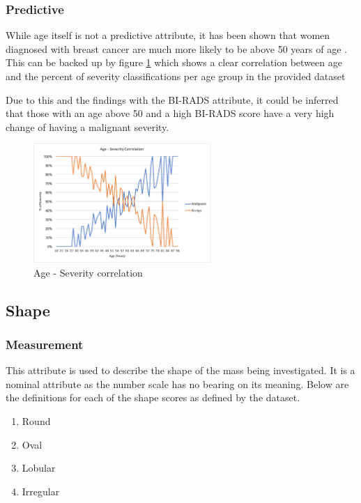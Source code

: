 \documentclass[12pt]{article}
\begin{document}
      \subsubsection{Predictive}
        While age itself is not a predictive attribute, it has been shown that women diagnosed with breast cancer are much more likely to be above 50 years of age \citep{kerlikowske1993mammography}. This can be backed up by figure \ref{fig:age-severity-correlation} which shows a clear correlation between age and the percent of severity classifications per age group in the provided dataset

        Due to this and the findings with the BI-RADS attribute, it could be inferred that those with an age above 50 and a high BI-RADS score have a very high change of having a malignant severity.

        \begin{figure}[H]
          \centering
          \includegraphics[width=0.6\textwidth]{age-severity-correlation}
          \caption{Age - Severity correlation}
          \label{fig:age-severity-correlation}
        \end{figure}

    \subsection{Shape}
      \subsubsection{Measurement}
        This attribute is used to describe the shape of the mass being investigated. It is a nominal attribute as the number scale has no bearing on its meaning. Below are the definitions for each of the shape scores as defined by the dataset.

        \begin{enumerate}[label=\arabic*)]
          \item Round
          \item Oval
          \item Lobular
          \item Irregular
        \end{enumerate}
\end{document}
